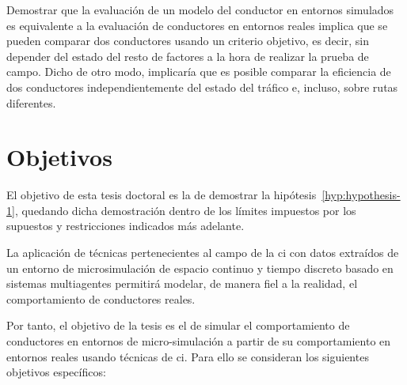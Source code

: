Demostrar que la evaluación de un modelo del conductor en entornos simulados es equivalente a la evaluación de conductores en entornos reales implica que se pueden comparar dos conductores usando un criterio objetivo, es decir, sin depender del estado del resto de factores a la hora de realizar la prueba de campo. Dicho de otro modo, implicaría que es posible comparar la eficiencia de dos conductores independientemente del estado del tráfico e, incluso, sobre rutas diferentes.

\section{Objetivos}
\label{ch:intro:objectives}

El objetivo de esta tesis doctoral es la de demostrar la hipótesis~\ref{hyp:hypothesis-1}, quedando dicha demostración dentro de los límites impuestos por los supuestos y restricciones indicados más adelante.

\begin{hyp} \label{hyp:hypothesis-1}
	La aplicación de técnicas pertenecientes al campo de la \gls{ci} con datos extraídos de un entorno de microsimulación de espacio continuo y tiempo discreto basado en sistemas multiagentes permitirá modelar, de manera fiel a la realidad, el comportamiento de conductores reales.
\end{hyp}

Por tanto, el objetivo de la tesis es el de simular el comportamiento de conductores en entornos de micro-simulación a partir de su comportamiento en entornos reales usando técnicas de \gls{ci}. Para ello se consideran los siguientes objetivos específicos:


